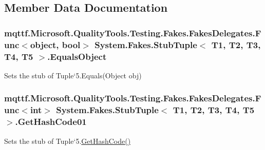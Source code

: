 \subsection{Member Data Documentation}
\hypertarget{class_system_1_1_fakes_1_1_stub_tuple_3_01_t1_00_01_t2_00_01_t3_00_01_t4_00_01_t5_01_4_a1dc3ae7f98851cea2f5c55bf7e18b4af}{
\subsubsection[{Equals\-Object}]{\setlength{\rightskip}{0pt plus 5cm}mqttf.\-Microsoft.\-Quality\-Tools.\-Testing.\-Fakes.\-Fakes\-Delegates.\-Func$<$object, bool$>$ System.\-Fakes.\-Stub\-Tuple$<$ T1, T2, T3, T4, T5 $>$.Equals\-Object}}\label{class_system_1_1_fakes_1_1_stub_tuple_3_01_t1_00_01_t2_00_01_t3_00_01_t4_00_01_t5_01_4_a1dc3ae7f98851cea2f5c55bf7e18b4af}


Sets the stub of Tuple`5.Equals(\-Object obj)

\hypertarget{class_system_1_1_fakes_1_1_stub_tuple_3_01_t1_00_01_t2_00_01_t3_00_01_t4_00_01_t5_01_4_abcfd5741ef89f3a26c667fb032f5bb99}{
\subsubsection[{Get\-Hash\-Code01}]{\setlength{\rightskip}{0pt plus 5cm}mqttf.\-Microsoft.\-Quality\-Tools.\-Testing.\-Fakes.\-Fakes\-Delegates.\-Func$<$int$>$ System.\-Fakes.\-Stub\-Tuple$<$ T1, T2, T3, T4, T5 $>$.Get\-Hash\-Code01}}\label{class_system_1_1_fakes_1_1_stub_tuple_3_01_t1_00_01_t2_00_01_t3_00_01_t4_00_01_t5_01_4_abcfd5741ef89f3a26c667fb032f5bb99}


Sets the stub of Tuple`5.\hyperlink{class_system_1_1_fakes_1_1_stub_tuple_3_01_t1_00_01_t2_00_01_t3_00_01_t4_00_01_t5_01_4_a7ea8128580a3e411c8aaf986c04e2549}{Get\-Hash\-Code()}

